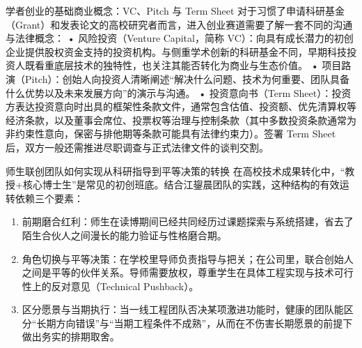 \documentclass[UTF8,a4paper,11pt,fontset=fandol]{ctexart}
\begin{document}
\begin{knowledgebox}{学者创业的基础商业概念：VC、Pitch 与 Term Sheet}
对于习惯了申请科研基金（Grant）和发表论文的高校研究者而言，进入创业赛道需要了解一套不同的沟通与法律概念：
• 风险投资（Venture Capital，简称 VC）：向具有成长潜力的初创企业提供股权资金支持的投资机构。与侧重学术创新的科研基金不同，早期科技投资人既看重底层技术的独特性，也关注其能否转化为商业与生态价值。
• 项目路演（Pitch）：创始人向投资人清晰阐述“解决什么问题、技术为何重要、团队具备什么优势以及未来发展方向”的演示与沟通。
• 投资意向书（Term Sheet）：投资方表达投资意向时出具的框架性条款文件，通常包含估值、投资额、优先清算权等经济条款，以及董事会席位、投票权等治理与控制条款（其中多数投资条款通常为非约束性意向，保密与排他期等条款可能具有法律约束力）。签署 Term Sheet 后，双方一般还需推进尽职调查与正式法律文件的谈判交割。
\end{knowledgebox}
\begin{importantbox}{师生联创团队如何实现从科研指导到平等决策的转换}
在高校技术成果转化中，“教授+核心博士生”是常见的初创班底。结合江鋆晨团队的实践，这种结构的有效运转依赖三个要素：
\begin{enumerate}
\item 前期磨合红利：师生在读博期间已经共同经历过课题探索与系统搭建，省去了陌生合伙人之间漫长的能力验证与性格磨合期。
\item 角色切换与平等决策：在学校里导师负责指导与把关；在公司里，联合创始人之间是平等的伙伴关系。导师需要放权，尊重学生在具体工程实现与技术可行性上的反对意见（Technical Pushback）。
\item 区分愿景与当期执行：当一线工程团队否决某项激进功能时，健康的团队能区分“长期方向错误”与“当期工程条件不成熟”，从而在不伤害长期愿景的前提下做出务实的排期取舍。
\end{enumerate}
\end{importantbox}
\end{document}
